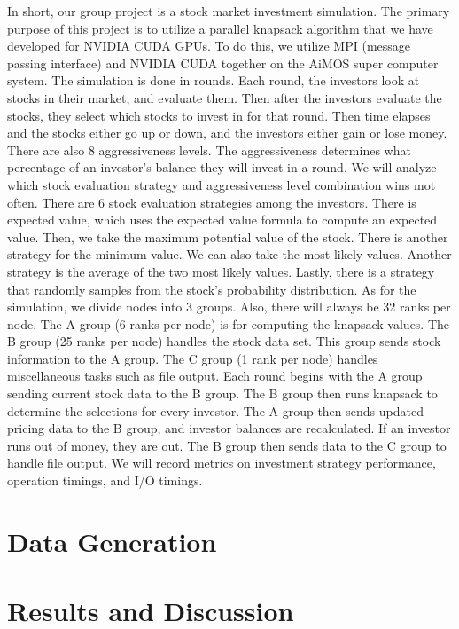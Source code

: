 \documentclass[conference]{IEEEtran}
\begin{document}
In short, our group project is a stock market investment simulation. The primary purpose of this project is to utilize a parallel knapsack algorithm that we have developed for NVIDIA CUDA GPUs. To do this, we utilize MPI (message passing interface) and NVIDIA CUDA together on the AiMOS super computer system.
The simulation is done in rounds. Each round, the investors look at stocks in their market, and evaluate them. Then after the investors evaluate the stocks, they select which stocks to invest in for that round. Then time elapses and the stocks either go up or down, and the investors either gain or lose money. There are also 8 aggressiveness levels. The aggressiveness determines what percentage of an investor’s balance they will invest in a round. We will analyze which stock evaluation strategy and aggressiveness level combination wins mot often.
There are 6 stock evaluation strategies among the investors. There is expected value, which uses the expected value formula to compute an expected value. Then, we take the maximum potential value of the stock. There is another strategy for the minimum value. We can also take the most likely values. Another strategy is the average of the two most likely values. Lastly, there is a strategy that randomly samples from the stock’s probability distribution.
As for the simulation, we divide nodes into 3 groups. Also, there will always be 32 ranks per node. The A group (6 ranks per node) is for computing the knapsack values. The B group (25 ranks per node) handles the stock data set. This group sends stock information to the A group. The C group (1 rank per node) handles miscellaneous tasks such as file output.
Each round begins with the A group sending current stock data to the B group. The B group then runs knapsack to determine the selections for every investor. The A group then sends updated pricing data to the B group, and investor balances are recalculated. If an investor runs out of money, they are out. The B group then sends data to the C group to handle file output. We will record metrics on investment strategy performance, operation timings, and I/O timings.

\section{Data Generation}
\label{sec:Data Generation}

\section{Results and Discussion}
\label{sec:results-and-discussion}
\end{document}
